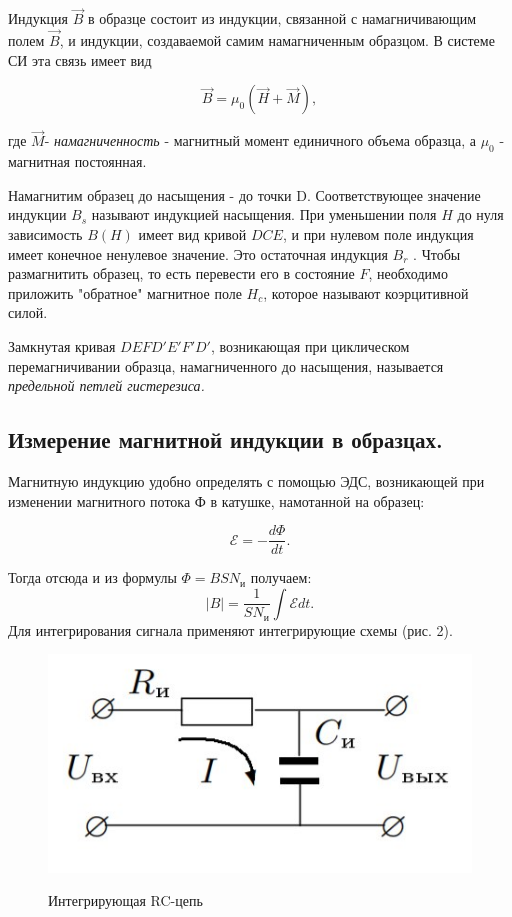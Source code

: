 \documentclass[12pt]{lab}
\begin{document}
Индукция $\vec{B}$ в образце состоит из индукции, связанной с
намагничивающим полем
$\vec{B}$, и индукции, создаваемой самим намагниченным
образцом.
В системе СИ эта связь имеет вид

$$\vec{B} = \mu_{0}(\vec{H}+\vec{M}),$$

где $\vec{M}$- \textit{намагниченность} - магнитный момент единичного
объема образца, а $\mu_{0}$ - магнитная постоянная.

Намагнитим образец до насыщения - до точки D. Соответствующее
значение индукции $B_{s}$ называют индукцией насыщения. При
уменьшении поля $H$ до нуля зависимость $B(H)$ имеет вид кривой
$DCE$, и при нулевом поле индукция имеет конечное ненулевое значение.
Это остаточная индукция $B_{r}$ . Чтобы размагнитить образец, то есть
перевести его в состояние
$F$, необходимо приложить "обратное" магнитное
поле $H_{c}$, которое называют коэрцитивной силой.

Замкнутая кривая $DEFD'E'F'D'$, возникающая при циклическом
перемагничивании образца, намагниченного до насыщения, называется
\textit{предельной петлей гистерезиса.}

\subsection{Измерение магнитной индукции в образцах.}
Магнитную индукцию удобно определять с помощью ЭДС, возникающей при
изменении магнитного потока Ф в катушке, намотанной на образец:

$$\mathscr{E} = -\dfrac{d\Phi}{dt}.$$

Тогда отсюда и из формулы $\Phi=BSN_{\text{и}}$ получаем:
$$|B|=\dfrac{1}{SN_{\text{и}}}\int \mathscr{E}dt.$$
Для интегрирования сигнала применяют интегрирующие схемы (рис. 2).

\begin{figure}
    \vspace{-20pt}
    \begin{center}
        \includegraphics[width=0.7\linewidth]{gist2.jpg}
        \label{fig:}
    \end{center}
    \vspace{-10pt}
    \caption{Интегрирующая RC-цепь}
\end{figure}
\end{document}
